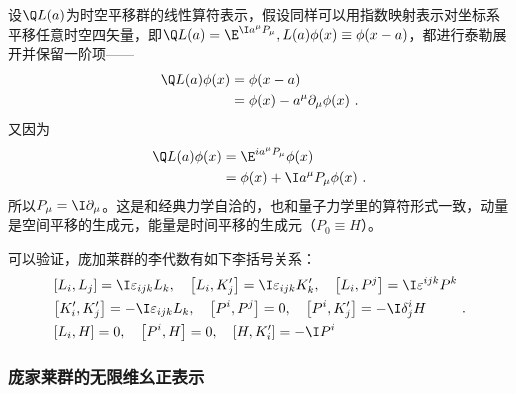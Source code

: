 设$\Q L(a)$为时空平移群的线性算符表示，假设同样可以用指数映射表示对坐标系平移任意时空四矢量，即$\Q L(a)=\E^{\I a^{\mu}P_{\mu}},L(a)\phi(x)\equiv \phi(x-a)$，都进行泰勒展开并保留一阶项——
\begin{equation}\begin{aligned}
\Q L(a)\phi(x)& =\phi(x-a) \\
&=\phi(x)-a^{\mu}\partial_{\mu}\phi(x)~.
\end{aligned}\end{equation}
又因为
\begin{equation}
\begin{aligned}
\Q L(a)\phi(x)& = \E^{ia^{\mu}P_{\mu}}\phi(x) \\
&=\phi(x)+\I a^{\mu}P_{\mu}\phi(x)~.
\end{aligned}
\end{equation}
所以$P_{\mu}=\I\partial_{\mu}$。这是和经典力学自洽的，也和量子力学里的算符形式一致，动量是空间平移的生成元，能量是时间平移的生成元（$P_0\equiv H$）。

可以验证，庞加莱群的李代数有如下李括号关系：
\begin{equation}
\begin{aligned}
& {\left[L_i, L_j\right]=\I \varepsilon_{i j k} L_k, \quad\left[L_i, K'_j\right]=\I \varepsilon_{i j k} K'_k, \quad\left[L_i, P^j\right]=\I \varepsilon^{i j k} P^k} \\
& {\left[K'_i, K'_j\right]=-\I \varepsilon_{i j k} L_k, \quad\left[P^i, P^j\right]=0, \quad\left[P^i, K'_j\right]=-\I \delta^i_j H} \\
& {\left[L_i, H\right]=0, \quad\left[P^i, H\right]=0, \quad\left[H, K'_i\right]=-\I P^i}
\end{aligned}~.
\end{equation}

\subsubsection{庞家莱群的无限维幺正表示}